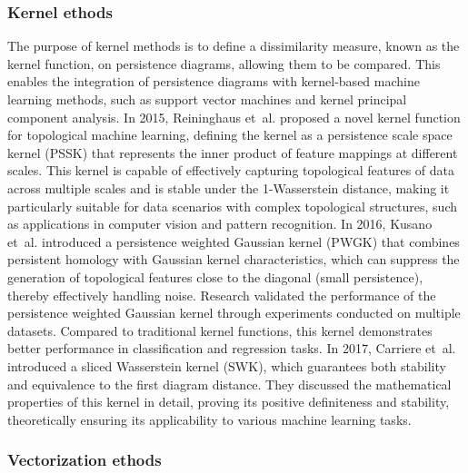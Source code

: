 \documentclass[5GeSdc,ASOC,numref,printGA,printHL,CASflow,nocrossmark,longtitle,PROOF]{/usr/local/texlive/iTemplates/01-Templates/01-Els-Jnl/01-Standard_Templates/V1/ELS_MDL5-V1-6}
\begin{document}
\begin{articlestyle}
\subsubsection{Kernel ethods}\label{subsec1.1.1}

The purpose of kernel methods is to define a dissimilarity measure, known as the kernel function, on persistence diagrams, allowing them to be compared. This enables the integration of persistence diagrams with kernel-based machine learning methods, such as support vector machines and kernel principal component analysis. In 2015, Reininghaus et~al. \cite{reininghaus2015stable} proposed a novel kernel function for topological machine learning, defining the kernel as a persistence scale space kernel (PSSK) that represents the inner product of feature mappings at different scales. This kernel is capable of effectively capturing topological features of data across multiple scales and is stable under the 1-Wasserstein distance, making it particularly suitable for data scenarios with complex topological structures, such as applications in computer vision and pattern recognition. In 2016, Kusano et~al. \cite{kusano2016persistence} introduced a persistence weighted Gaussian kernel (PWGK) that combines persistent homology with Gaussian kernel characteristics, which can suppress the generation of topological features close to the diagonal (small persistence), thereby effectively handling noise. Research validated the performance of the persistence weighted Gaussian kernel through experiments conducted on multiple datasets. Compared to traditional kernel functions, this kernel demonstrates better performance in classification and regression tasks. In 2017, Carriere et~al. \cite{carriere2017sliced} introduced a sliced Wasserstein kernel (SWK), which guarantees both stability and equivalence to the first diagram distance. They discussed the mathematical properties of this kernel in detail, proving its positive definiteness and stability, theoretically ensuring its applicability to various machine learning tasks.

\subsubsection{Vectorization ethods}\label{sec1.1.2}


\end{articlestyle}
\end{document}
